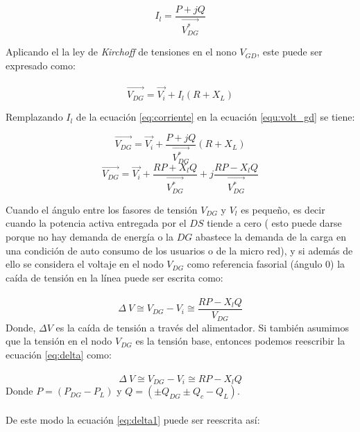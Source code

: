 \documentclass[12pt, letterpaper]{report}
\begin{document}
\begin{equation}
I_{l}= \dfrac{P + jQ}{\overrightarrow{V_{DG}^{*}}}
\label{eq:corriente}
\end{equation}

Aplicando el la ley de \textit{ Kirchoff } de tensiones en el nono  $V_{GD}$, este  puede ser expresado como:\\\\
\begin{equation}
\label{equ:volt_gd}
\overrightarrow{V_{DG}}= \overrightarrow{V_{i}} + I_{l}(R + X_{L})
\end{equation}

Remplazando $ I_{l} $ de  la ecuación \ref{eq:corriente} en la ecuación  \ref{equ:volt_gd} se tiene:

\[\overrightarrow{V_{DG}}= \overrightarrow{V_{i}} + \dfrac{P + jQ}{\overrightarrow{V_{DG}^{*}}}(R + X_{L})\]
\begin{equation}
\overrightarrow{V_{DG}}= \overrightarrow{V_{i}} + \dfrac{RP + X_{l}Q}{\overrightarrow{V_{DG}^{*}}} + j\dfrac{RP - X_{l}Q }{\overrightarrow{V_{DG}^{*}}}
\end{equation}

Cuando el ángulo entre los fasores de tensión  $V_{DG}$  y $V_{l}$ es pequeño, es decir cuando la potencia activa entregada por el $DS$ tiende a cero \cite{Akagi2017} (  esto puede darse porque no hay demanda de energía o la $DG$ abastece la demanda de la carga en una condición de auto consumo de los usuarios o de la micro red), y si además de ello se considera el voltaje en el nodo $V_{DG}$ como referencia fasorial (ángulo 0) la caída de tensión en la línea puede ser escrita como:\\\\
\begin{equation}
\Delta\ V \cong V_{DG} - V_{i}\cong \dfrac{RP - X_{l}Q }{V_{DG}}
\label{eq:delta} 
\end{equation}
Donde, $\Delta V$ es la caída de tensión a través del alimentador. Si también asumimos que la tensión en el nodo  $V_{DG}$  es la tensión base, entonces podemos reescribir la ecuación \ref{eq:delta} como:\\\\
\begin{equation}
\Delta\ V \cong V_{DG} - V_{i}\cong RP - X_{l}Q 
\label{eq:delta1} 
\end{equation}
Donde $P=(P_{DG}-P_{L})$  y  $ Q = (\pm Q_{DG} \pm Q_{c} - Q_{L})$.\\\\
De este modo la ecuación \ref{eq:delta1} puede ser reescrita así:
\end{document}
